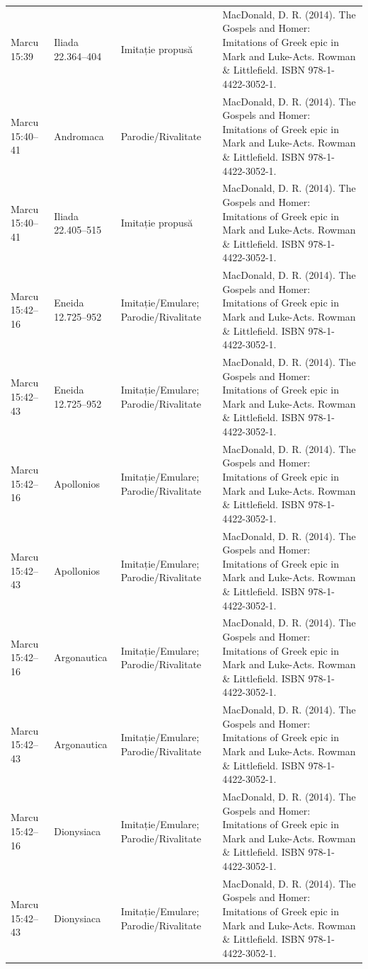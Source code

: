 \documentclass[12pt,a4paper,twoside,openany]{book}
\begin{document}
\begin{longtable}{L{1.4cm}L{1.7cm}L{3.1cm}L{8.4cm}}
Marcu 15:39 & Iliada 22.364–404 & Imitație propusă & MacDonald, D. R. (2014). The Gospels and Homer: Imitations of Greek epic in Mark and Luke-Acts. Rowman \& Littlefield. ISBN 978-1-4422-3052-1. \\
Marcu 15:40–41 & Andromaca & Parodie/Rivalitate & MacDonald, D. R. (2014). The Gospels and Homer: Imitations of Greek epic in Mark and Luke-Acts. Rowman \& Littlefield. ISBN 978-1-4422-3052-1. \\
Marcu 15:40–41 & Iliada 22.405–515 & Imitație propusă & MacDonald, D. R. (2014). The Gospels and Homer: Imitations of Greek epic in Mark and Luke-Acts. Rowman \& Littlefield. ISBN 978-1-4422-3052-1. \\
Marcu 15:42–16 & Eneida 12.725–952 & Imitație/Emulare; Parodie/Rivalitate & MacDonald, D. R. (2014). The Gospels and Homer: Imitations of Greek epic in Mark and Luke-Acts. Rowman \& Littlefield. ISBN 978-1-4422-3052-1. \\
Marcu 15:42–43 & Eneida 12.725–952 & Imitație/Emulare; Parodie/Rivalitate & MacDonald, D. R. (2014). The Gospels and Homer: Imitations of Greek epic in Mark and Luke-Acts. Rowman \& Littlefield. ISBN 978-1-4422-3052-1. \\
Marcu 15:42–16 & Apollonios & Imitație/Emulare; Parodie/Rivalitate & MacDonald, D. R. (2014). The Gospels and Homer: Imitations of Greek epic in Mark and Luke-Acts. Rowman \& Littlefield. ISBN 978-1-4422-3052-1. \\
Marcu 15:42–43 & Apollonios & Imitație/Emulare; Parodie/Rivalitate & MacDonald, D. R. (2014). The Gospels and Homer: Imitations of Greek epic in Mark and Luke-Acts. Rowman \& Littlefield. ISBN 978-1-4422-3052-1. \\
Marcu 15:42–16 & Argonautica & Imitație/Emulare; Parodie/Rivalitate & MacDonald, D. R. (2014). The Gospels and Homer: Imitations of Greek epic in Mark and Luke-Acts. Rowman \& Littlefield. ISBN 978-1-4422-3052-1. \\
Marcu 15:42–43 & Argonautica & Imitație/Emulare; Parodie/Rivalitate & MacDonald, D. R. (2014). The Gospels and Homer: Imitations of Greek epic in Mark and Luke-Acts. Rowman \& Littlefield. ISBN 978-1-4422-3052-1. \\
Marcu 15:42–16 & Dionysiaca & Imitație/Emulare; Parodie/Rivalitate & MacDonald, D. R. (2014). The Gospels and Homer: Imitations of Greek epic in Mark and Luke-Acts. Rowman \& Littlefield. ISBN 978-1-4422-3052-1. \\
Marcu 15:42–43 & Dionysiaca & Imitație/Emulare; Parodie/Rivalitate & MacDonald, D. R. (2014). The Gospels and Homer: Imitations of Greek epic in Mark and Luke-Acts. Rowman \& Littlefield. ISBN 978-1-4422-3052-1. \\

\end{longtable}
\end{document}
